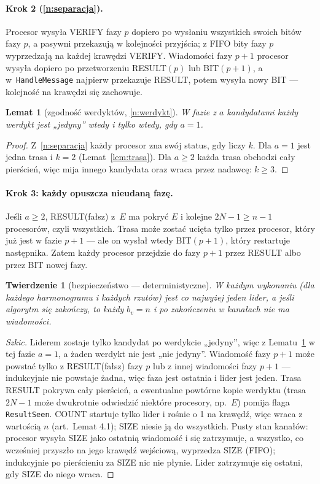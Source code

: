 \documentclass[11pt,a4paper]{article}
\newtheorem{lemat}{Lemat}
\newtheorem{twierdzenie}{Twierdzenie}
\theoremstyle{definition}
\newcommand{\msg}[1]{\textsf{\small #1}}
\newcommand{\fn}[1]{\texttt{#1}}
\begin{document}
\paragraph{Krok 2 (\ref{n:separacja}).} Procesor wysyła \msg{VERIFY} fazy $p$ dopiero po wysłaniu
wszystkich swoich bitów fazy $p$, a pasywni przekazują w kolejności przyjścia; z FIFO bity fazy $p$
wyprzedzają na każdej krawędzi \msg{VERIFY}. Wiadomości fazy $p+1$ procesor wysyła dopiero po
przetworzeniu \msg{RESULT}$(p)$ lub \msg{BIT}$(p{+}1)$, a w~\fn{HandleMessage} najpierw przekazuje
\msg{RESULT}, potem wysyła nowy \msg{BIT} — kolejność na krawędzi się zachowuje.

\begin{lemat}[zgodność werdyktów, \ref{n:werdykt}]\label{lem:zgodnosc}
W fazie z $a$ kandydatami każdy werdykt jest „jedyny” wtedy i tylko wtedy, gdy $a=1$.
\end{lemat}
\begin{proof}
Z~\ref{n:separacja} każdy procesor zna swój status, gdy liczy $k$. Dla $a=1$ jest jedna trasa i $k=2$
(Lemat~\ref{lem:trasa}). Dla $a\ge2$ każda trasa obchodzi cały pierścień, więc mija innego kandydata
oraz wraca przez nadawcę: $k\ge3$.
\end{proof}

\paragraph{Krok 3: każdy opuszcza nieudaną fazę.} Jeśli $a\ge2$, \msg{RESULT}(fałsz) z~$E$ ma pokryć
$E$ i kolejne $2N-1\ge n-1$ procesorów, czyli wszystkich. Trasa może zostać ucięta tylko przez procesor,
który już jest w fazie $p+1$ — ale on wysłał wtedy \msg{BIT}$(p{+}1)$, który restartuje następnika.
Zatem każdy procesor przejdzie do fazy $p+1$ przez \msg{RESULT} albo przez \msg{BIT} nowej fazy.

\begin{twierdzenie}[bezpieczeństwo — deterministyczne]
W każdym wykonaniu (dla każdego harmonogramu i każdych rzutów) jest co najwyżej jeden lider, a jeśli
algorytm się zakończy, to każdy $b_v=n$ i po zakończeniu w kanałach nie ma wiadomości.
\end{twierdzenie}
\begin{proof}[Szkic]
Liderem zostaje tylko kandydat po werdykcie „jedyny”, więc z Lematu~\ref{lem:zgodnosc} w tej fazie
$a=1$, a żaden werdykt nie jest „nie jedyny”. Wiadomość fazy $p+1$ może powstać tylko z \msg{RESULT}(fałsz)
fazy $p$ lub z innej wiadomości fazy $p+1$ — indukcyjnie nie powstaje żadna, więc faza jest ostatnia
i lider jest jeden. Trasa \msg{RESULT} pokrywa cały pierścień, a ewentualne powtórne kopie werdyktu (trasa
$2N-1$ może dwukrotnie odwiedzić niektóre procesory, np.\ $E$) pomija flaga \fn{ResultSeen}.
\msg{COUNT} startuje tylko lider i rośnie o 1 na krawędź, więc wraca z wartością $n$ (art.\ Lemat 4.1);
\msg{SIZE} niesie ją do wszystkich. Pusty stan kanałów: procesor wysyła \msg{SIZE} jako ostatnią
wiadomość i się zatrzymuje, a wszystko, co wcześniej przyszło na jego krawędź wejściową, wyprzedza
\msg{SIZE} (FIFO); indukcyjnie po pierścieniu za \msg{SIZE} nic nie płynie. Lider zatrzymuje się
ostatni, gdy \msg{SIZE} do niego wraca.
\end{proof}
\end{document}
